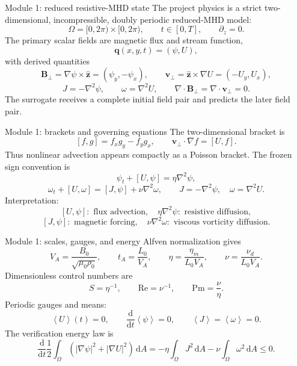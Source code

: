 \documentclass[aspectratio=169,11pt]{beamer}
\newcommand{\bracket}[2]{\left[#1,#2\right]}
\newcommand{\dd}{\,\mathrm{d}}
\newcommand{\avg}[1]{\left\langle #1\right\rangle}
\newcommand{\vect}[1]{\bm{#1}}
\newcommand{\OmegaD}{\Omega=[0,2\pi)\times[0,2\pi)}
\newcommand{\currentmodule}{Module 1}
\newcommand{\moduleprogress}{1 of 4}
\newcommand{\setmodule}[2]{%
  \renewcommand{\currentmodule}{#1}%
  \renewcommand{\moduleprogress}{#2}%
}
\begin{document}

\setmodule{Module 1}{1 of 4}
\begin{frame}[t]{Module 1: reduced resistive-MHD state}
\vspace{-0.15em}
The project physics is a strict two-dimensional, incompressible, doubly periodic reduced-MHD model:
\[
\OmegaD,\qquad t\in[0,T],\qquad \partial_z=0.
\]
The primary scalar fields are magnetic flux and stream function,
\[
\vect q(x,y,t)=(\psi,U),
\]
with derived quantities
\[
\vect B_\perp=\nabla\psi\times\widehat{\vect z}=(\psi_y,-\psi_x),\qquad
\vect v_\perp=\widehat{\vect z}\times\nabla U=(-U_y,U_x),
\]
\[
J=-\nabla^2\psi,\qquad \omega=\nabla^2U,
\qquad \nabla\cdot\vect B_\perp=\nabla\cdot\vect v_\perp=0.
\]
The surrogate receives a complete initial field pair and predicts the later field pair.
\end{frame}

\setmodule{Module 1}{2 of 4}
\begin{frame}[t]{Module 1: brackets and governing equations}
\vspace{-0.15em}
The two-dimensional bracket is
\[
\bracket{f}{g}=f_xg_y-f_yg_x,
\qquad
\vect v_\perp\cdot\nabla f=\bracket{U}{f}.
\]
Thus nonlinear advection appears compactly as a Poisson bracket. The frozen sign convention is
\[
\boxed{\psi_t+\bracket{U}{\psi}=\eta\nabla^2\psi,}
\]
\[
\boxed{\omega_t+\bracket{U}{\omega}=\bracket{J}{\psi}+\nu\nabla^2\omega,}
\qquad
J=-\nabla^2\psi,
\quad
\omega=\nabla^2U.
\]
Interpretation:
\[
\bracket{U}{\psi}:\text{ flux advection},\quad
\eta\nabla^2\psi:\text{ resistive diffusion},
\]
\[
\bracket{J}{\psi}:\text{ magnetic forcing},\quad
\nu\nabla^2\omega:\text{ viscous vorticity diffusion}.
\]
\end{frame}

\setmodule{Module 1}{3 of 4}
\begin{frame}[t]{Module 1: scales, gauges, and energy}
\vspace{-0.15em}
Alfven normalization gives
\[
V_A=\frac{B_0}{\sqrt{\mu_0\rho_0}},
\qquad
t_A=\frac{L_0}{V_A},
\qquad
\eta=\frac{\eta_m}{L_0V_A},
\qquad
\nu=\frac{\nu_d}{L_0V_A}.
\]
Dimensionless control numbers are
\[
S=\eta^{-1},\qquad \mathrm{Re}=\nu^{-1},\qquad \mathrm{Pm}=\frac{\nu}{\eta}.
\]
Periodic gauges and means:
\[
\avg{U}(t)=0,
\qquad
\frac{\mathrm d}{\mathrm dt}\avg{\psi}=0,
\qquad
\avg J=\avg\omega=0.
\]
The verification energy law is
\[
\boxed{\frac{\mathrm d}{\mathrm dt}\frac12\int_\Omega(|\nabla\psi|^2+|\nabla U|^2)\dd A
=-\eta\int_\Omega J^2\dd A-\nu\int_\Omega\omega^2\dd A\le0.}
\]
\end{frame}
\end{document}

